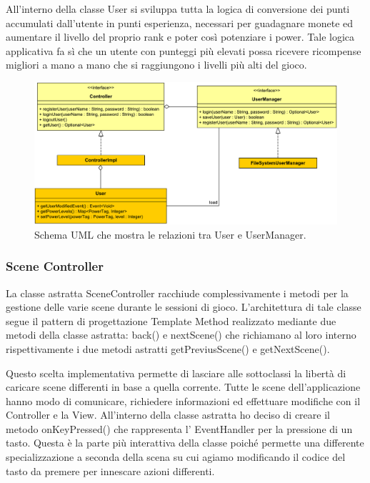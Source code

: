 \documentclass[a4paper,12pt]{report}
\begin{document}
All'interno della classe User si sviluppa tutta la logica di conversione dei punti accumulati dall'utente in punti esperienza, necessari per guadagnare monete ed aumentare il livello del proprio rank e poter così potenziare i power. Tale logica applicativa fa sì che un utente con punteggi più elevati possa ricevere ricompense migliori a mano a mano che si raggiungono i livelli più alti del gioco.

\begin{figure}[H]
\includegraphics[width=\linewidth]{img/user}
\caption{Schema UML che mostra le relazioni tra User e UserManager.}
\label{img:user}
\end{figure}

\subsubsection*{Scene Controller}
La classe astratta SceneController racchiude complessivamente i metodi per la gestione delle varie scene durante le sessioni di gioco.
L'architettura di tale classe segue il pattern di progettazione Template Method realizzato mediante due metodi della classe astratta: back() e nextScene() che richiamano al loro interno rispettivamente i due metodi astratti getPreviusScene() e getNextScene().

Questo scelta implementativa permette di lasciare alle sottoclassi la libertà di caricare scene differenti in base a quella corrente.
Tutte le scene dell'applicazione hanno modo di comunicare, richiedere informazioni ed effettuare modifiche con il Controller e la View.
All'interno della classe astratta ho deciso di creare il metodo onKeyPressed() che rappresenta l' EventHandler per la pressione di un tasto.
Questa è la parte più interattiva della classe poiché permette una differente specializzazione a seconda della scena su cui agiamo modificando il codice del tasto da premere per innescare azioni differenti.
\end{document}
